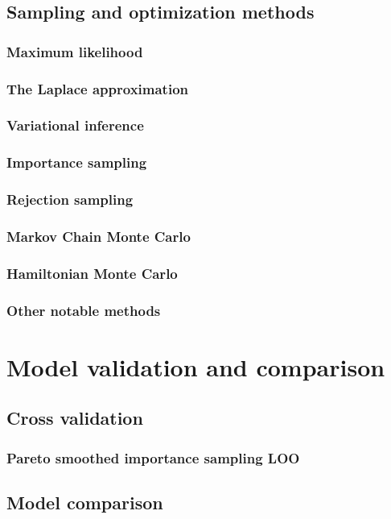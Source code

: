 \documentclass[]{report}
\begin{document}
\subsection{Sampling and optimization methods}
\subsubsection{Maximum likelihood}
\subsubsection{The Laplace approximation}
\subsubsection{Variational inference}
\subsubsection{Importance sampling}
\subsubsection{Rejection sampling}
\subsubsection{Markov Chain Monte Carlo}
\subsubsection{Hamiltonian Monte Carlo}
\subsubsection{Other notable methods}

\section{Model validation and comparison}
\subsection{Cross validation}
\subsubsection{Pareto smoothed importance sampling LOO}
\subsection{Model comparison}
\end{document}
